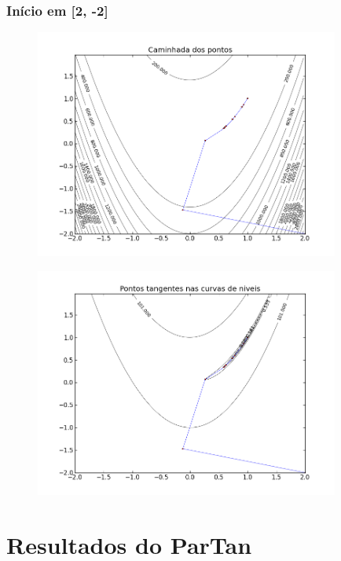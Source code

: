 \documentclass[12pt]{article}
\begin{document}
\clearpage
\subsubsection{Início em [2, -2]}

\begin{figure}[!h]
\begin{center}
\includegraphics[width=10cm]{2_2_partan.png}
\end{center}
\end{figure}

\begin{figure}[!h]
\begin{center}
\includegraphics[width=10cm]{2_2_tangente.png}
\end{center}
\end{figure}

\newpage



\section{Resultados do ParTan}
\mbox{}
\end{document}
